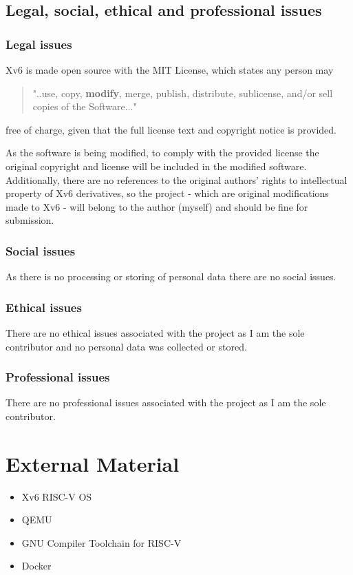 \begin{appendices}
\section{Legal, social, ethical and professional issues}


\subsection{Legal issues}
Xv6 is made open source with the MIT License, which states any person may
\begin{quote}
    "..use, copy, \textbf{modify}, merge, publish,
    distribute, sublicense, and/or sell copies of the Software..."
\end{quote}
free of charge, given that the full license text and copyright notice
is provided.

As the software is being modified, to comply with the provided license the
original copyright and license will be included in the modified software.
Additionally, there are no references to the original authors' rights to intellectual
property of Xv6 derivatives, so the project - which are original modifications
made to Xv6 - will belong to the author (myself) and should be fine for submission.
\subsection{Social issues}
As there is no processing or storing of personal data there are no social issues.
\subsection{Ethical issues}
There are no ethical issues associated with the project as I am the sole contributor
and no personal data was collected or stored.
\subsection{Professional issues}
There are no professional issues associated with the project as I am the sole contributor.

%
%
\chapter{External Material}
\begin{itemize}
    \item Xv6 RISC-V OS
    \item QEMU
    \item GNU Compiler Toolchain for RISC-V
    \item Docker
\end{itemize}




\end{appendices}
